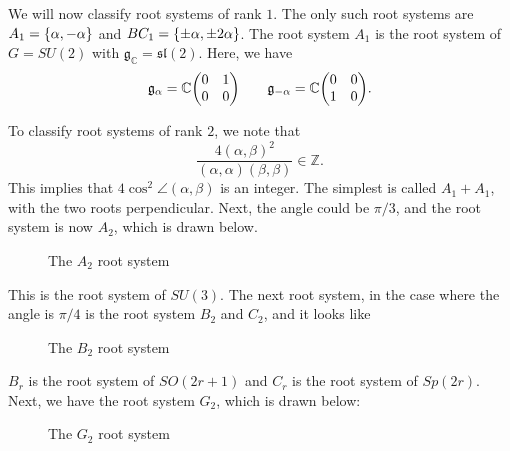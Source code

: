 \documentclass[leqno, openany]{memoir}
\theoremstyle{definition}
\theoremstyle{remark}
\theoremstyle{plain}
\theoremstyle{definition}
\theoremstyle{remark}
\newcommand{\C}{\mathbb{C}}
\newcommand{\Z}{\mathbb{Z}}
\newcommand{\mf}[1]{\mathfrak{#1}}
\begin{document}
We will now classify root systems of rank $1$. The only such root systems are $A_1 = \qty{\alpha, -\alpha}$ and $BC_1 = \qty{\pm \alpha, \pm 2\alpha}$. The root system $A_1$ is the root system of $G = SU(2)$ with $\mf{g}_{\C} = \mf{sl}(2)$. Here, we have
\[ \mf{g}_{\alpha} = \C \mqty(0 & 1 \\ 0 & 0) \qquad \mf{g}_{-\alpha} = \C \mqty(0 & 0 \\ 1 & 0). \]

To classify root systems of rank $2$, we note that
\[ \frac{4 {(\alpha, \beta)}^2}{(\alpha, \alpha)(\beta, \beta)} \in \Z. \]
This implies that $4 \cos^2 \angle(\alpha, \beta)$ is an integer. The simplest is called $A_1 + A_1$, with the two roots perpendicular. Next, the angle could be $\pi/3$, and the root system is now $A_2$, which is drawn below.

\begin{figure}[H]
\begin{center}
\end{center}
\caption{The $A_2$ root system}%
\label{fig:}
\end{figure}


This is the root system of $SU(3)$. The next root system, in the case where the angle is $\pi/4$ is the root system $B_2$ and $C_2$, and it looks like

\begin{figure}[H]
\begin{center}
\end{center}
\caption{The $B_2$ root system}%
\label{fig:}
\end{figure}

$B_r$ is the root system of $SO(2r+1)$ and $C_r$ is the root system of $Sp(2r)$. Next, we have the root system $G_2$, which is drawn below:

\begin{figure}[H]
\begin{center}
\end{center}
\caption{The $G_2$ root system}%
\label{fig:}
\end{figure}
\end{document}
